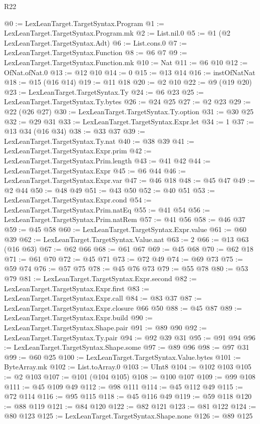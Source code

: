 \begin{lexlean}{R22}
\begin{coremodule}
@0 := LexLeanTarget.TargetSyntax.Program
@1 := LexLeanTarget.TargetSyntax.Program.mk
@2 := List.nil.{0}
@5 := @1 (@2 LexLeanTarget.TargetSyntax.Adt)
@6 := List.cons.{0}
@7 := LexLeanTarget.TargetSyntax.Function
@8 := @6 @7
@9 := LexLeanTarget.TargetSyntax.Function.mk
@10 := Nat
@11 := @6 @10
@12 := OfNat.ofNat.{0}
@13 := @12 @10
@14 := 0
@15 := @13 @14
@16 := instOfNatNat
@18 := @15 (@16 @14)
@19 := @11 @18
@20 := @2 @10
@22 := @9 (@19 @20)
@23 := LexLeanTarget.TargetSyntax.Ty
@24 := @6 @23
@25 := LexLeanTarget.TargetSyntax.Ty.bytes
@26 := @24 @25
@27 := @2 @23
@29 := @22 (@26 @27)
@30 := LexLeanTarget.TargetSyntax.Ty.option
@31 := @30 @25
@32 := @29 @31
@33 := LexLeanTarget.TargetSyntax.Expr.let
@34 := 1
@37 := @13 @34 (@16 @34)
@38 := @33 @37
@39 := LexLeanTarget.TargetSyntax.Ty.nat
@40 := @38 @39
@41 := LexLeanTarget.TargetSyntax.Expr.prim
@42 := LexLeanTarget.TargetSyntax.Prim.length
@43 := @41 @42
@44 := LexLeanTarget.TargetSyntax.Expr
@45 := @6 @44
@46 := LexLeanTarget.TargetSyntax.Expr.var
@47 := @46 @18
@48 := @45 @47
@49 := @2 @44
@50 := @48 @49
@51 := @43 @50
@52 := @40 @51
@53 := LexLeanTarget.TargetSyntax.Expr.cond
@54 := LexLeanTarget.TargetSyntax.Prim.natEq
@55 := @41 @54
@56 := LexLeanTarget.TargetSyntax.Prim.natRem
@57 := @41 @56
@58 := @46 @37
@59 := @45 @58
@60 := LexLeanTarget.TargetSyntax.Expr.value
@61 := @60 @39
@62 := LexLeanTarget.TargetSyntax.Value.nat
@63 := 2
@66 := @13 @63 (@16 @63)
@67 := @62 @66
@68 := @61 @67
@69 := @45 @68
@70 := @62 @18
@71 := @61 @70
@72 := @45 @71
@73 := @72 @49
@74 := @69 @73
@75 := @59 @74
@76 := @57 @75
@78 := @45 @76 @73
@79 := @55 @78
@80 := @53 @79
@81 := LexLeanTarget.TargetSyntax.Expr.second
@82 := LexLeanTarget.TargetSyntax.Expr.first
@83 := LexLeanTarget.TargetSyntax.Expr.call
@84 := @83 @37
@87 := LexLeanTarget.TargetSyntax.Expr.closure @66 @50
@88 := @45 @87
@89 := LexLeanTarget.TargetSyntax.Expr.build
@90 := LexLeanTarget.TargetSyntax.Shape.pair
@91 := @89 @90
@92 := LexLeanTarget.TargetSyntax.Ty.pair
@94 := @92 @39 @31
@95 := @91 @94
@96 := LexLeanTarget.TargetSyntax.Shape.some
@97 := @89 @96
@98 := @97 @31
@99 := @60 @25
@100 := LexLeanTarget.TargetSyntax.Value.bytes
@101 := ByteArray.mk
@102 := List.toArray.{0}
@103 := UInt8
@104 := @102 @103
@105 := @2 @103
@107 := @101 (@104 @105)
@108 := @100 @107
@109 := @99 @108
@111 := @45 @109 @49
@112 := @98 @111
@114 := @45 @112 @49
@115 := @72 @114
@116 := @95 @115
@118 := @45 @116 @49
@119 := @59 @118
@120 := @88 @119
@121 := @84 @120
@122 := @82 @121
@123 := @81 @122
@124 := @80 @123
@125 := LexLeanTarget.TargetSyntax.Shape.none
@126 := @89 @125

\end{coremodule}
\end{lexlean}
